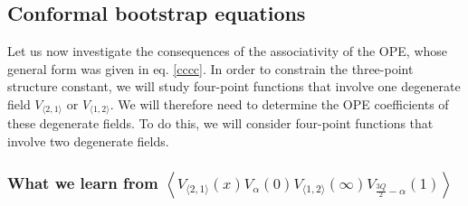 \documentclass[12pt, a4paper, notitlepage, twoside]{report}
\numberwithin{equation}{section}
\theoremstyle{break}
\begin{document}
\subsection{Conformal bootstrap equations \label{seccbe}}

Let us now investigate the consequences of the associativity of the OPE, whose general form was given in eq. \eqref{cccc}. In order to constrain the three-point structure constant, we will study four-point functions that involve one degenerate field $V_{\langle 2,1\rangle}$ or $V_{\langle 1, 2\rangle}$. We will therefore need to determine the OPE coefficients of these degenerate fields. 
To do this, we will consider four-point functions that involve two degenerate fields. 

\subsubsection{What we learn from $
 \left\langle V_{\langle 2,1\rangle}(x) V_\alpha(0) V_{\langle 1, 2\rangle}(\infty) V_{\frac{3Q}{2}-\alpha}(1)\right\rangle$}
 
\end{document}
